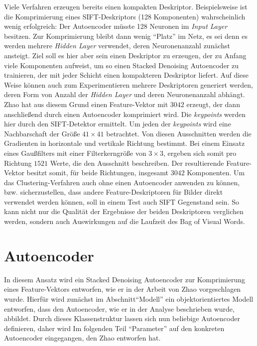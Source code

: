 Viele Verfahren erzeugen bereits einen kompakten Deskriptor. Beispielsweise ist die Komprimierung eines SIFT-Deskriptors (128 Komponenten) wahrscheinlich wenig erfolgreich: Der Autoencoder müsste 128 Neuronen im \textit{Input Layer} besitzen. Zur Komprimierung bleibt dann wenig \enquote{Platz} im Netz, es sei denn es werden mehrere \textit{Hidden Layer} verwendet, deren Neuronenanzahl zunächst ansteigt. Ziel soll es hier aber sein einen Deskriptor zu erzeugen, der zu Anfang viele Komponenten aufweist, um so einen Stacked Denoising Autoencoder zu trainieren, der mit jeder Schicht einen kompakteren Deskriptor liefert. Auf diese Weise können auch zum Experimentieren mehrere Deskriptoren generiert werden, deren Form von Anzahl der \textit{Hidden Layer} und deren Neuronenanzahl abhängt.\newline
Zhao \cite{aed2016} hat aus diesem Grund einen Feature-Vektor mit $3042$ erzeugt, der dann anschließend durch einen Autoencoder komprimiert wird. Die \textit{keypoints} werden hier durch den SIFT-Detektor ermittelt. Um jeden der \textit{keypoints} wird eine Nachbarschaft der Größe $41 \times 41$ betrachtet. Von diesen Ausschnitten werden die Gradienten in horizontale und vertikale Richtung bestimmt. Bei einem Einsatz eines Gaußfilters mit einer Filterkerngröße von $3 \times 3$, ergeben sich somit pro Richtung $1521$ Werte, die den Ausschnitt beschreiben. Der resultierende Feature-Vektor besitzt somit, für beide Richtungen, insgesamt $3042$ Komponenten.\newline
Um das Clustering-Verfahren auch ohne einen Autoencoder anwenden zu können, bzw. sicherzustellen, dass andere Feature-Deskriptoren für Bilder direkt verwendet werden können, soll in einem Test auch SIFT Gegenstand sein. So kann nicht nur die Qualität der Ergebnisse der beiden Deskriptoren verglichen werden, sondern auch Auswirkungen auf die Laufzeit des Bag of Visual Words.

\section{Autoencoder}

In diesem Ansatz wird ein Stacked Denoising Autoencoder zur Komprimierung eines Feature-Vektors entworfen, wie er in der Arbeit von Zhao \cite{aed2016} vorgeschlagen wurde. Hierfür wird zunächst im Abschnitt\enquote{Modell} ein objektorientiertes Modell entworfen, dass den Autoencoder, wie er in der Analyse beschrieben wurde, abbildet. Durch dieses Klassenstruktur lassen sich nun beliebige Autoencoder definieren, daher wird Im folgenden Teil \enquote{Parameter} auf den konkreten Autoencoder eingegangen, den Zhao entworfen hat.

